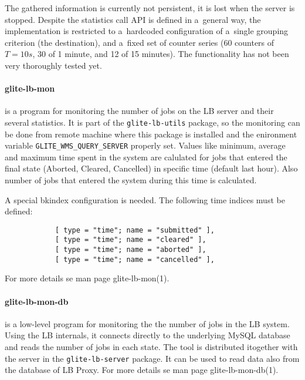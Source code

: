 The gathered information is currently not persistent, it is lost when the server is stopped.
Despite the statistics call API is defined in a~general way, the implementation is
restricted to a~hardcoded configuration of a~single grouping criterion (the destination),
and a~fixed set of counter series (60 counters of $T=10s$, 30 of 1 minute, and 12 of 15 minutes).
The functionality has not been very thoroughly tested yet.




\paragraph{glite-lb-mon} is a program for monitoring the number of jobs on the
LB server and their several statistics. It is part of the
\verb'glite-lb-utils' package, so the monitoring can be done from remote machine
where this package is installed and the enironment variable
\verb'GLITE_WMS_QUERY_SERVER' properly set. Values like minimum, average and
maximum time spent in the system are calulated for jobs that entered  the
final  state (Aborted,  Cleared,  Cancelled) in specific time (default last
hour). Also number of jobs that entered the system during this time is
calculated.

A special bkindex configuration is needed. 
The following time indices must be defined:
\begin{verbatim}
            [ type = "time"; name = "submitted" ],
            [ type = "time"; name = "cleared" ],
            [ type = "time"; name = "aborted" ],
            [ type = "time"; name = "cancelled" ],
\end{verbatim}
For more details se man page glite-lb-mon(1).


\paragraph{glite-lb-mon-db} is a low-level program for monitoring the the
number of jobs in the LB system. Using the LB internals, it connects directly
to the underlying MySQL database and reads the number of jobs in each state.
The tool is distributed itogether with the server in the \verb'glite-lb-server' package.
It can be used to read data also from the database of LB Proxy.
For more details se man page glite-lb-mon-db(1).


